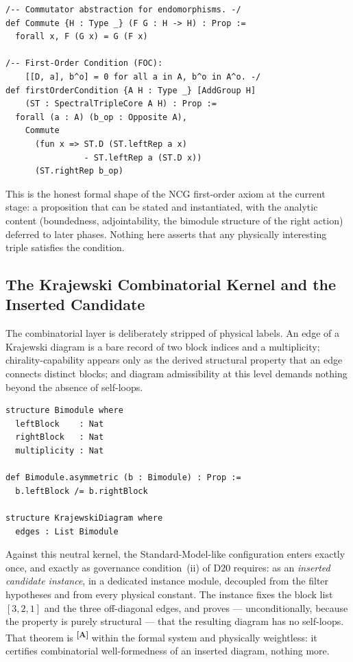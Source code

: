 \documentclass[12pt,a4paper,twoside]{article}
\theoremstyle{plain}
\theoremstyle{definition}
\theoremstyle{remark}
\newcommand{\catmark}[1]{\textsuperscript{\textsf{\textbf{[#1]}}}}
\begin{document}
\begin{lstlisting}
/-- Commutator abstraction for endomorphisms. -/
def Commute {H : Type _} (F G : H -> H) : Prop :=
  forall x, F (G x) = G (F x)

/-- First-Order Condition (FOC):
    [[D, a], b^o] = 0 for all a in A, b^o in A^o. -/
def firstOrderCondition {A H : Type _} [AddGroup H]
    (ST : SpectralTripleCore A H) : Prop :=
  forall (a : A) (b_op : Opposite A),
    Commute
      (fun x => ST.D (ST.leftRep a x)
                - ST.leftRep a (ST.D x))
      (ST.rightRep b_op)
\end{lstlisting}

This is the honest formal shape of the NCG first-order axiom at the
current stage: a proposition that can be stated and instantiated, with the
analytic content (boundedness, adjointability, the bimodule structure of
the right action) deferred to later phases. Nothing here asserts that any
physically interesting triple satisfies the condition.

\subsection{The Krajewski Combinatorial Kernel and the Inserted Candidate}
\label{subsec:krajewski}

The combinatorial layer is deliberately stripped of physical labels. An
edge of a Krajewski diagram is a bare record of two block indices and a
multiplicity; chirality-capability appears only as the derived structural
property that an edge connects distinct blocks; and diagram admissibility
at this level demands nothing beyond the absence of self-loops.

\begin{lstlisting}
structure Bimodule where
  leftBlock    : Nat
  rightBlock   : Nat
  multiplicity : Nat

def Bimodule.asymmetric (b : Bimodule) : Prop :=
  b.leftBlock /= b.rightBlock

structure KrajewskiDiagram where
  edges : List Bimodule
\end{lstlisting}

Against this neutral kernel, the Standard-Model-like configuration enters
exactly once, and exactly as governance condition~(ii) of D20 requires: as
an \emph{inserted candidate instance}, in a dedicated instance module,
decoupled from the filter hypotheses and from every physical constant. The
instance fixes the block list $[3,2,1]$ and the three off-diagonal edges,
and proves --- unconditionally, because the property is purely structural
--- that the resulting diagram has no self-loops. That theorem is
\catmark{A} within the formal system and physically weightless: it
certifies combinatorial well-formedness of an inserted diagram, nothing
more.
\end{document}
